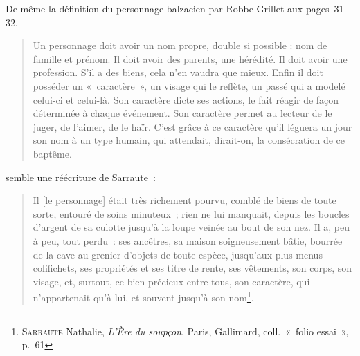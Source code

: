 \documentclass[12pt, a4paper]{article}
\begin{document}
De même la définition du personnage balzacien par Robbe-Grillet aux pages~31-32,
\begin{quote}
    Un personnage doit avoir un nom propre, double si possible : nom de famille et prénom. Il doit avoir des parents, une hérédité. Il doit avoir une profession. S’il a des biens, cela n’en vaudra que mieux. Enfin il doit posséder un «~caractère~», un visage qui le reflète, un passé qui a modelé celui-ci et celui-là. Son caractère dicte ses actions, le fait réagir de façon déterminée à chaque événement. Son caractère permet au lecteur de le juger, de l’aimer, de le haïr. C’est grâce à ce caractère qu’il léguera un jour son nom à un type humain, qui attendait, dirait-on, la consécration de ce baptême.
\end{quote}
semble une réécriture de Sarraute~:
\begin{quote}
    Il [le personnage] était très richement pourvu, comblé de biens de toute sorte, entouré de soins minuteux~; rien ne lui manquait, depuis les boucles d'argent de sa culotte jusqu'à la loupe veinée au bout de son nez. Il a, peu à peu, tout perdu~: ses ancêtres, sa maison soigneusement bâtie, bourrée de la cave au grenier d'objets de toute espèce, jusqu'aux plus menus colifichets, ses propriétés et ses titre de rente, ses vêtements, son corps, son visage, et, surtout, ce bien précieux entre tous, son caractère, qui n'appartenait qu'à lui, et souvent jusqu'à son nom\footnote{\textsc{Sarraute} Nathalie, \textit{L'Ère du soupçon}, Paris, Gallimard, coll.~«~folio essai~», p.~61}.  
\end{quote}
\end{document}
